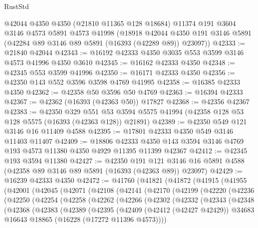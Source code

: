 \begin{lexlean}{RustStd}
\begin{coremodule}
    @42044
    @4350
    @4350
    (@21810 @11365 @128 @18684)
    @11374
    @191
    @3604
    @3146
    @4573
    @5891
    @4573
    @41998
    (@18918 @42044 @4350 @191 @3146 @5891 (@42284 @89 @3146 @89 @5891 (@16393 (@42289 @89)) @23097))
@42333 := @21840 @42044
@42343 := @16192 @42333 @4350 @3035 @553 @3599 @3146 @4573 @41996 @4350 @3610
@42345 := @16162 @42333 @4350
@42348 := @42345 @553 @3599 @41996
@42350 := @16171 @42333 @4350
@42356 := @42350 @143 @552 @3596 @3598 @4769 @41995
@42358 := @16385 @42333 @4350
@42362 := @42358 @50 @3596 @50 @4769
@42363 := @16394 @42333
@42367 := @42362 (@16393 (@42363 @50)) @17827
@42368 := @42356 @42367
@42383 := @42350
    @329
    @551
    @53
    @3594
    @5575
    @41994
    (@42358 @128 @53 @128 @5575 (@16393 (@42363 @128)) @21891)
@42389 := @42350 @549 @121 @3146 @16 @11409 @4588
@42395 := @17801 @42333 @4350 @549 @3146 @11403 @11407
@42409 := @18806
    @42333
    @4350
    @143
    @3594
    @3146
    @4769
    @193
    @4573
    @11380
    @4350
    @4929
    @11395
    @11399
    @42367
@42412 := @42345 @193 @3594 @11380
@42427 := @42350
    @191
    @121
    @3146
    @16
    @5891
    @4588
    (@42358 @89 @3146 @89 @5891 (@16393 (@42363 @89)) @23097)
@42429 := @16239 @42333 @4350
@42472 := @41760
    (@41821
      (@41872
        (@41915
          (@41955
            (@42001
              (@42045
                (@42071
                  (@42108
                    (@42141
                      (@42170
                        (@42199
                          (@42220
                            (@42236
                              (@42250
                                (@42254
                                  (@42258
                                    (@42262
                                      (@42266
                                        (@42302
                                          (@42332
                                            (@42343
                                              (@42348
                                                (@42368
                                                  (@42383
                                                    (@42389
                                                      (@42395
                                                        (@42409
                                                          (@42412 (@42427 @42429))
                                                          @34683
                                                          @16643
                                                          @18865
                                                          (@16228 (@17272 @11396 @4573))))

\end{coremodule}
\end{lexlean}
